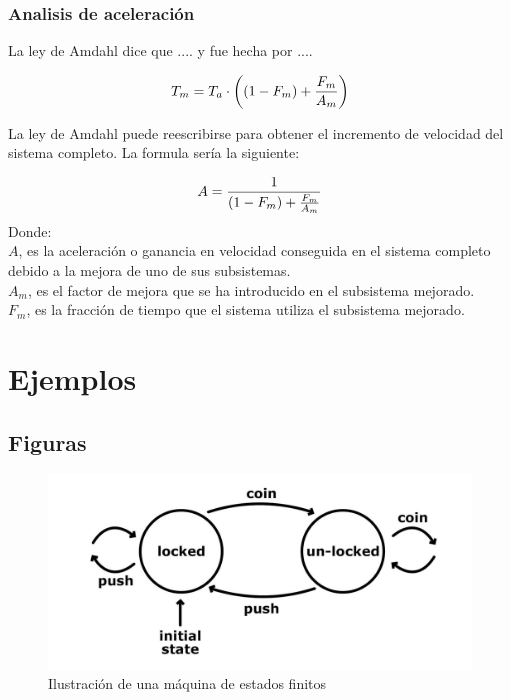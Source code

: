 \documentclass{report}
\begin{document}
\subsection{Analisis de aceleración}

La ley de Amdahl dice que .... y fue hecha por ....

\begin{displaymath}	
	{T_{m} = {T_{a} \cdot \left((1 - F_{m}) + {F_{m} \over A_{m}}\right)}}
\end{displaymath}

La ley de Amdahl puede reescribirse para obtener el incremento de velocidad del sistema completo. La formula sería la siguiente:

\begin{displaymath}	
	A = {1 \over (1 - F_{m}) + {F_{m} \over A_{m}}}	
\end{displaymath}
Donde:\\
$A$, es la aceleración o ganancia en velocidad conseguida en el sistema completo debido a la mejora de uno de sus subsistemas.\\
$A_{m}$, es el factor de mejora que se ha introducido en el subsistema mejorado.\\
$F_{m} $, es la fracción de tiempo que el sistema utiliza el subsistema mejorado.\\






\chapter{Ejemplos}\label{ejemplos}

\section{Figuras}\label{figuras}
\begin{figure}
    \centering
    \includegraphics[width=0.8\linewidth]{figuras/maquinaDeEstados.jpg}
    \caption{Ilustración de una máquina de estados finitos}
    \label{fig:msf}
\end{figure}
\end{document}
